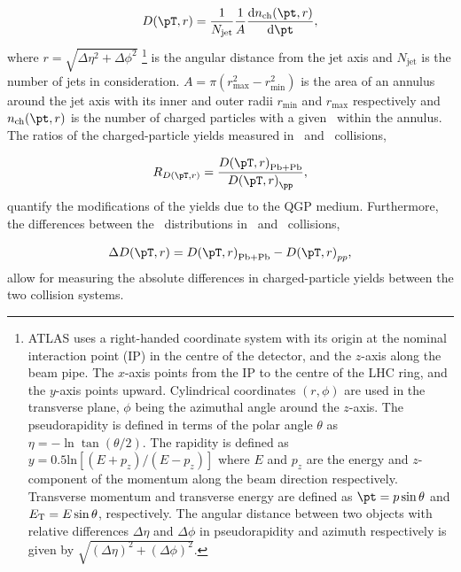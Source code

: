 \begin{align*}
\Dptr = \frac{1}{N_{\mathrm{jet}}} \frac{1}{A} \frac{\mathrm{d} n_{\mathrm{ch}} (\pt, r)}{\mathrm{d} \pt},
\end{align*}
where $r = \sqrt{\Delta \eta^2 + \Delta \phi^2}$ \footnote{
ATLAS uses a right-handed coordinate system with its origin at the nominal interaction point (IP) in the centre of the detector, and the $z$-axis along the beam pipe. The $x$-axis points from the IP to the centre of the LHC ring, and the $y$-axis points upward. Cylindrical coordinates $(r,\phi)$ are used in the transverse plane, $\phi$ being the azimuthal angle around the $z$-axis. The pseudorapidity is defined in terms of the polar angle $\theta$ as $\eta=-\ln\tan(\theta/2)$. The rapidity is defined as $y = 0.5\text{ln}[(E + p_z)/(E-p_z)]$ where $E$ and $p_z$ are the energy and $z$-component of the momentum along the beam direction respectively. Transverse momentum and transverse energy are defined as $\pt = p \sin\theta$ and $\mbox{$E_{\mathrm{T}}$} = E \sin\theta$, respectively. The angular distance between two objects with relative differences $\Delta \eta$ and $\Delta \phi$ in pseudorapidity and azimuth respectively is given by $\sqrt{(\Delta \eta )^2 + (\Delta \phi)^2}$.} 
is the angular distance from the jet axis and $N_{\mathrm{jet}}$ is the number of jets in consideration.
$A = \pi (r_{\mathrm{max}}^2 - r_{\mathrm{min}}^2) $ is the area of an annulus around the jet axis with
its inner and outer radii $r_{\mathrm{min}}$ and $r_{\mathrm{max}}$ respectively and $n_{\mathrm{ch}}(\pt, r)$
is the number of charged particles with a given \pt\ within the annulus. The ratios of the charged-particle yields measured in \pbpb\ and \pp\ collisions,

\begin{align*}
   \RDptr = \frac{\Dptr_\mathrm{Pb+Pb}}{\Dptr_{\pp}},
\end{align*}
quantify the modifications of the yields due to the QGP medium. Furthermore, the differences between the \Dptr\ distributions in \pbpb\ and \pp\ collisions, 

\begin{align*}
   \Delta \Dptr = \Dptr_\mathrm{Pb+Pb} - \Dptr_{pp},
\end{align*}
allow for measuring the absolute differences in charged-particle yields between the two collision systems. 


